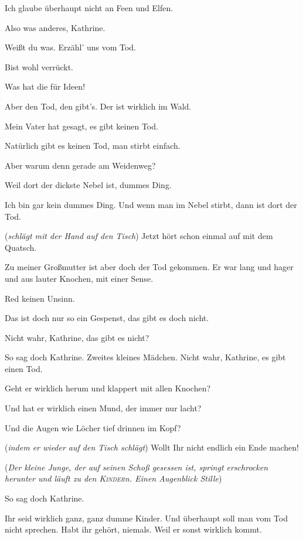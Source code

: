 \documentclass[
	final,
	a4paper,
	ngerman,
	mpinclude = true, %
	twoside = true,
	open = right,
	cleardoublepage = plain,
	DIV = 13,
	BCOR = 1cm,
	titlepage = firstiscover,
	]{scrbook}
\newcommand{\direction}[1]{(\textit{#1})}
\newcommand{\thecharacter}[1]{\textup{\textsc{#1}}\xspace}
\newcommand{\theJosef}{\thecharacter{Josef}}
\newcommand{\theKathrine}{\thecharacter{Kathrine}}
\newcommand{\theKinder}{\thecharacter{Kinder}}
\newcommand{\character}[1]{\item[#1]}
\newcommand{\Josef}{\character{\theJosef}}
\newcommand{\Kathrine}{\character{\theKathrine}}
\newcommand{\Kinder}{\character{\theKinder}}
\newcommand{\Junge}[1]{\character{Junge #1}}
\newcommand{\Maedchen}[1]{\character{Mädchen #1}}
\begin{document}
\begin{play}
\Junge{3}
Ich glaube überhaupt nicht an Feen und Elfen.

\Kinder
Also was anderes, Kathrine.

\Maedchen{1}
Weißt du was. Erzähl' uns vom Tod.

\Junge{1}
Bist wohl verrückt.

\Maedchen{3}
Was hat die für Ideen!

\Maedchen{1}
Aber den Tod, den gibt's. Der ist wirklich im Wald.

\Junge{3}
Mein Vater hat gesagt, es gibt keinen Tod.

\Maedchen{4}
Natürlich gibt es keinen Tod, man stirbt einfach.

\Maedchen{1}
Aber warum denn gerade am Weidenweg?

\Junge{1}
Weil dort der dickste Nebel ist, dummes Ding.

\Maedchen{1}
Ich bin gar kein dummes Ding. Und wenn man im Nebel stirbt, dann ist dort der Tod.

\Josef
\direction{schlägt mit der Hand auf den Tisch} Jetzt hört schon einmal auf mit dem Quatsch.

\Maedchen{3}
Zu meiner Großmutter ist aber doch der Tod gekommen. Er war lang und hager und aus lauter Knochen, mit einer Sense.

\Junge{1}
Red keinen Unsinn.

\Junge{4}
Das ist doch nur so ein Gespenst, das gibt es doch nicht.

\Maedchen{4}
Nicht wahr, Kathrine, das gibt es nicht?

\Junge{1}
So sag doch Kathrine. Zweites kleines Mädchen. Nicht wahr, Kathrine, es gibt einen Tod.

\Maedchen{3}
Geht er wirklich herum und klappert mit allen Knochen?

\Maedchen{2}
Und hat er wirklich einen Mund, der immer nur lacht?

\Maedchen{3}
Und die Augen wie Löcher tief drinnen im Kopf?

\Josef
\direction{indem er wieder auf den Tisch schlägt} Wollt Ihr nicht endlich ein Ende machen!

\direction{Der kleine Junge, der auf seinen Schoß gesessen ist, springt erschrocken herunter und läuft zu den \theKinder{}n. Einen Augenblick Stille}

\Maedchen{1}
So sag doch Kathrine.

\Kathrine
Ihr seid wirklich ganz, ganz dumme Kinder. Und überhaupt soll man vom Tod nicht sprechen. Habt ihr gehört, niemals. Weil er sonst wirklich kommt.


\end{play}
\end{document}
